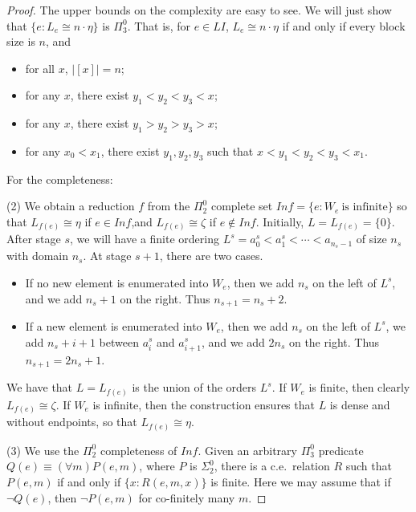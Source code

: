 \documentclass[10pt,a4paper]{amsart}
\begin{document}
\begin{proof} The upper bounds on the complexity are easy to see. 
We will just show that  $\{e: L_e \cong n \cdot \eta\}$ is $\Pi^0_3$.
That is, for $e \in LI$, $L_e \cong n \cdot \eta$ if and only if every block size is $n$, and 
\begin{itemize}
\item for all $x$, $|[x]| = n$;
\item for any $x$, there exist $y_1 < y_2 < y_3 < x$;
\item for any $x$, there exist $y_1 > y_2 > y_3 > x$;
\item for any $x_0 < x_1$, there exist $y_1,y_2,y_3$ such that 
$x < y_1 < y_2 < y_3 < x_1$. 
\end{itemize}

\medskip

For the completeness:

(2) We obtain a reduction $f$ from the $\Pi^0_2$ complete set $Inf = \{e: W_e\ \text{is infinite}\}$ so that $L_{f(e)} \cong \eta$ if $e \in Inf$,and $L_{f(e)} \cong \zeta$ if $e \notin Inf$. Initially, $L = L_{f(e)} = \{0\}$. After stage $s$, we will have a finite ordering $L^s = a_0^s < a_1^s < \dotsb < a_{n_s -1}$ of size $n_s$ with domain $n_s$.  At stage $s+1$, there are two cases.

\begin{itemize}
    \item If no new element is enumerated into $W_e$, then we add $n_s$ on the left of $L^s$,  and we add $n_s+1$ on the right. Thus $n_{s+1} = n_s+2$.
    \item If a new element is enumerated into $W_e$, then we add $n_s$ on the left of $L^s$,
    we add $n_s+i+1$ between $a_i^s$ and $a_{i+1}^s$, and we add $2n_s$ on the right. Thus $n_{s+1} = 2n_s+1$. 
\end{itemize}

We have that $L = L_{f(e)}$ is the union of the orders $L^s$. If $W_e$ is finite, then clearly $L_{f(e)} \cong \zeta$. If $W_e$ is infinite, then the construction ensures that $L$ is dense and without endpoints, so that $L_{f(e)} \cong \eta$. 


(3) We use the $\Pi^0_2$ completeness of $Inf$. Given an arbitrary $\Pi^0_3$ predicate $Q(e) \equiv (\forall m) P(e,m)$, where $P$ is $\Sigma^0_2$, there is a c.e.\ relation $R$ such that $P(e,m)$ if and only if $\{x: R(e,m,x)\}$ is finite. Here we may assume that if $\neg Q(e)$, then $\neg P(e,m)$ for co-finitely many $m$. 


\end{proof}
\end{document}
